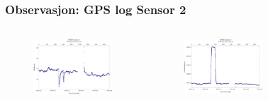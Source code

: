 \documentclass[xcolor=table]{beamer}
\begin{document}
\begin{frame}
\frametitle{Observasjon: GPS log Sensor 2}
    \vspace{-40pt}
    \begin{columns}
      \begin{figure}
        \includegraphics[scale=0.40]{thesis/graphics/gnssAlt2-1.png}
      \end{figure}
      \vspace{-30pt}
      \begin{figure}
        \includegraphics[scale=0.40]{thesis/graphics/gnssLat2-1.png}
      \end{figure}
      \begin{figure}

\end{figure}
\end{columns}
\end{frame}
\end{document}
